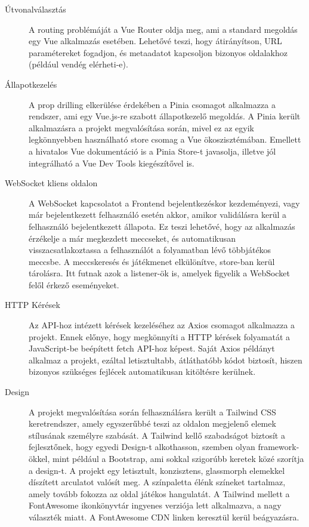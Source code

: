 \begin{description}
    \item[Útvonalválasztás]A routing problémáját a Vue Router oldja meg, ami a standard megoldás egy Vue alkalmazás esetében. Lehetővé teszi, hogy átirányítson, URL paramétereket fogadjon, és metaadatot kapcsoljon bizonyos oldalakhoz (például vendég elérheti-e).
    \item[Állapotkezelés]A prop drilling elkerülése érdekében a Pinia csomagot alkalmazza a rendszer, ami egy Vue.js-re szabott állapotkezelő megoldás. A Pinia került alkalmazásra a projekt megvalósítása során, mivel ez az egyik legkönnyebben használható store csomag a Vue ökoszisztémában. Emellett a hivatalos Vue dokumentáció is a Pinia Store-t javasolja, illetve jól integrálható a Vue Dev Tools kiegészítővel is.
    \item[WebSocket kliens oldalon]A WebSocket kapcsolatot a Frontend bejelentkezéskor kezdeményezi, vagy már bejelentkezett felhasználó esetén akkor, amikor validálásra kerül a felhasználó bejelentkezett állapota. Ez teszi lehetővé, hogy az alkalmazás érzékelje a már megkezdett meccseket, és automatikusan visszacsatlakoztassa a felhasználót a folyamatban lévő többjátékos meccsbe. A meccskeresés és játékmenet elkülönítve, store-ban kerül tárolásra. Itt futnak azok a listener-ök is, amelyek figyelik a WebSocket felől érkező eseményeket.
    \item[HTTP Kérések]Az API-hoz intézett kérések kezeléséhez az Axios csomagot alkalmazza a projekt. Ennek előnye, hogy megkönnyíti a HTTP kérések folyamatát a JavaScript-be beépített fetch API-hoz képest. Saját Axios példányt alkalmaz a projekt, ezáltal letisztultabb, átláthatóbb kódot biztosít, hiszen bizonyos szükséges fejlécek automatikusan kitöltésre kerülnek.  
    \item[Design]A projekt megvalósítása során felhasználásra került a Tailwind CSS keretrendszer, amely egyszerűbbé teszi az oldalon megjelenő elemek stílusának személyre szabását. A Tailwind kellő szabadságot biztosít a fejlesztőnek, hogy egyedi Design-t alkothasson, szemben olyan framework-ökkel, mint például a Bootstrap, ami sokkal szigorúbb keretek közé szorítja a design-t. A projekt egy letisztult, konzisztens, glassmorph elemekkel díszített arculatot valósít meg. A színpaletta élénk színeket tartalmaz, amely tovább fokozza az oldal játékos hangulatát. A Tailwind mellett a FontAwesome ikonkönyvtár ingyenes verziója lett alkalmazva, a nagy választék miatt. A FontAwesome CDN linken keresztül kerül beágyazásra.
\end{description}

